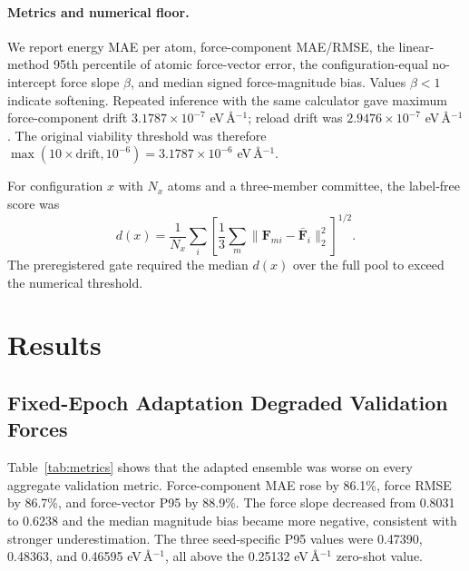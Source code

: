 \documentclass{article}
\begin{document}
\paragraph{Metrics and numerical floor.}
We report energy MAE per atom, force-component MAE/RMSE, the linear-method 95th percentile of atomic force-vector error, the configuration-equal no-intercept force slope $\beta$, and median signed force-magnitude bias. Values $\beta<1$ indicate softening. Repeated inference with the same calculator gave maximum force-component drift $3.1787\times10^{-7}$ eV\,\AA$^{-1}$; reload drift was $2.9476\times10^{-7}$ eV\,\AA$^{-1}$. The original viability threshold was therefore $\max(10\times\text{drift},10^{-6})=3.1787\times10^{-6}$ eV\,\AA$^{-1}$.

For configuration $x$ with $N_x$ atoms and a three-member committee, the label-free score was
\begin{equation}
d(x)=\frac{1}{N_x}\sum_i\left[\frac{1}{3}\sum_m
\lVert\mathbf F_{mi}-\bar{\mathbf F}_i\rVert_2^2\right]^{1/2}.
\end{equation}
The preregistered gate required the median $d(x)$ over the full pool to exceed the numerical threshold.

\section{Results}

\subsection{Fixed-Epoch Adaptation Degraded Validation Forces}

Table~\ref{tab:metrics} shows that the adapted ensemble was worse on every aggregate validation metric. Force-component MAE rose by 86.1\%, force RMSE by 86.7\%, and force-vector P95 by 88.9\%. The force slope decreased from 0.8031 to 0.6238 and the median magnitude bias became more negative, consistent with stronger underestimation. The three seed-specific P95 values were 0.47390, 0.48363, and 0.46595 eV\,\AA$^{-1}$, all above the 0.25132 eV\,\AA$^{-1}$ zero-shot value.
\end{document}
